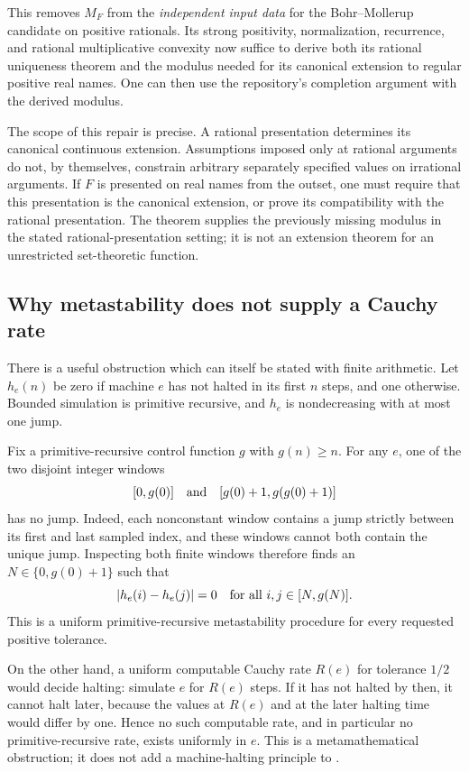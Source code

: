 This removes $M_F$ from the \emph{independent input data} for the
Bohr--Mollerup candidate on positive rationals.  Its strong positivity,
normalization, recurrence, and rational multiplicative convexity now
suffice to derive both its rational uniqueness theorem and the modulus
needed for its canonical extension to regular positive real names.
One can then use the repository's completion argument with the
derived modulus.

The scope of this repair is precise.  A rational presentation determines
its canonical continuous extension.  Assumptions imposed only at rational
arguments do not, by themselves, constrain arbitrary separately specified
values on irrational arguments.  If $F$ is presented on real names from
the outset, one must require that this presentation is the canonical
extension, or prove its compatibility with the rational presentation.
The theorem supplies the previously missing modulus in the stated
rational-presentation setting; it is not an extension theorem for an
unrestricted set-theoretic function.

\subsection{Why metastability does not supply a Cauchy rate}

There is a useful obstruction which can itself be stated with finite
arithmetic.  Let $h_e(n)$ be zero if machine $e$ has not halted in its
first $n$ steps, and one otherwise.  Bounded simulation is primitive
recursive, and $h_e$ is nondecreasing with at most one jump.

Fix a primitive-recursive control function $g$ with $g(n)\ge n$.
For any $e$, one of the two disjoint integer windows
\[
 [0,g(0)]\quad\hbox{and}\quad
 [g(0)+1,g(g(0)+1)]
\]
has no jump.  Indeed, each nonconstant window contains a jump strictly
between its first and last sampled index, and these windows cannot
both contain the unique jump.  Inspecting both finite windows therefore
finds an $N\in\{0,g(0)+1\}$ such that
\[
 |h_e(i)-h_e(j)|=0
 \quad\hbox{for all }i,j\in[N,g(N)].
\]
This is a uniform primitive-recursive metastability procedure for
every requested positive tolerance.

On the other hand, a uniform computable Cauchy rate $R(e)$ for tolerance
$1/2$ would decide halting: simulate $e$ for $R(e)$ steps.  If it has
not halted by then, it cannot halt later, because the values at
$R(e)$ and at the later halting time would differ by one.  Hence no
such computable rate, and in particular no primitive-recursive rate,
exists uniformly in $e$.  This is a metamathematical obstruction; it
does not add a machine-halting principle to \iPRA.

